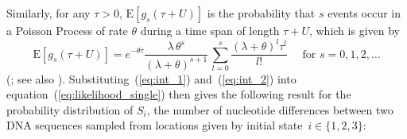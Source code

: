 \documentclass[11pt]{article}
\begin{document}
Similarly, for any $\tau>0$, $\mathrm{E}[g_{s}(\tau+U)]$ is the probability that $s$ events occur  in a Poisson Process of rate 
$\theta$ during a time span of length $\tau + U$, which is given by
\begin{equation}
\label{eq:int_2}
\mathrm{E}[g_{s}(\tau+U)]=e^{-\theta \tau}\frac{\lambda\,\theta^s}{(\lambda+\theta)^{s+1}}\,\sum_{l=0}^{s}\frac{\left(\lambda+\theta\right)^{l}\tau^{l}}{l!}~~~~~~\mbox{for } s=0,1,2, \ldots
\end{equation}
(\citealp{Takahata1995}; see also \citealp{Herbots2008}).
Substituting~(\ref{eq:int_1}) and~(\ref{eq:int_2}) into equation~(\ref{eq:likelihood_single}) then gives the following result for the probability distribution of $S_i$, the number of nucleotide differences between two DNA sequences sampled from locations given by initial state~$i \in \{1,2,3\}$:
\end{document}
